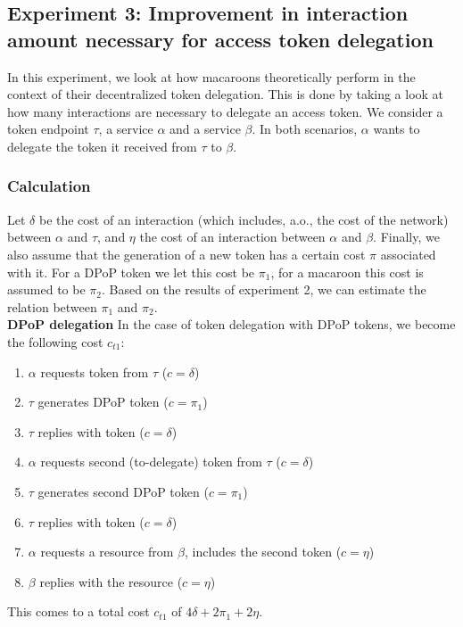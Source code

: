 \subsection{Experiment 3: Improvement in interaction amount necessary for access token delegation}
\label{sec:interactions-access-token-delegation}
In this experiment, we look at how macaroons theoretically perform in the context of their decentralized token delegation. This is done by taking a look at how many interactions are necessary to delegate an access token. We consider a token endpoint $\tau$, a service $\alpha$ and a service $\beta$. In both scenarios, $\alpha$ wants to delegate the token it received from $\tau$ to $\beta$.

\subsubsection{Calculation}
Let $\delta$ be the cost of an interaction (which includes, a.o., the cost of the network) between $\alpha$ and $\tau$, and $\eta$ the cost of an interaction between $\alpha$ and $\beta$. Finally, we also assume that the generation of a new token has a certain cost $\pi$ associated with it. For a \gls{DPoP} token we let this cost be $\pi_1$, for a macaroon this cost is assumed to be $\pi_2$. Based on the results of experiment 2, we can estimate the relation between $\pi_1$ and $\pi_2$.\\

\noindent\textbf{DPoP delegation} In the case of token delegation with \gls{DPoP} tokens, we become the following cost $c_{t1}$:
\begin{multicols}{2}
\begin{enumerate}
    \item $\alpha$ requests token from $\tau$ ($c = \delta$)
    \item $\tau$ generates \gls{DPoP} token ($c = \pi_1$)
    \item $\tau$ replies with token ($c = \delta$)
    \item $\alpha$ requests second (to-delegate) token from $\tau$ ($c = \delta$)
    \item $\tau$ generates second \gls{DPoP} token ($c = \pi_1$)
    \item $\tau$ replies with token ($c = \delta$)
    \item $\alpha$ requests a resource from $\beta$, includes the second token ($c = \eta$)
    \item $\beta$ replies with the resource ($c = \eta$)
\end{enumerate}
\end{multicols}
\noindent This comes to a total cost $c_{t1}$ of $4\delta + 2\pi_1 + 2\eta$.\\

